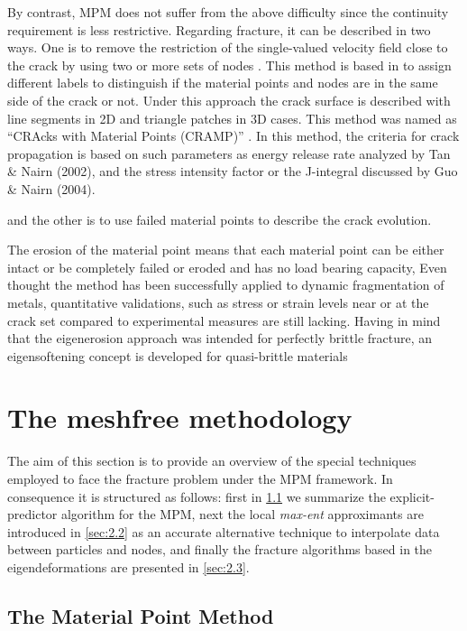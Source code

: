 \documentclass[preprint,12pt,a4paper]{elsarticle}
\begin{document}
By contrast, MPM does not suffer from the above difficulty since the
continuity requirement is less restrictive. Regarding fracture, it can
be described in two ways. One is to remove the restriction of the single-valued velocity field close to the crack by using two or
more sets of nodes \cite{Nairn_2006}. This method is based in to
assign different labels to distinguish if the material points and
nodes are in the same side of the crack or not. Under this approach
the crack surface is described with line segments in 2D and triangle
patches in 3D cases. This method was named as ``CRAcks with Material
Points (CRAMP)'' \cite{Nairn_2003}. In this method, the criteria for
crack propagation is based on such parameters as energy release rate
analyzed by Tan \& Nairn (2002)\cite{Nairn_2002}, and the stress
intensity factor or the J-integral discussed by Guo \& Nairn
(2004)\cite{Nairn_2004}.

and the other is to use failed material points to
describe the crack evolution.

The erosion of the material point means that each material point can
be either intact or be completely failed or eroded and has no load
bearing capacity, Even thought the method has been successfully
applied to dynamic fragmentation of metals, quantitative validations,
such as stress or strain levels near or at the crack set compared to
experimental measures are still lacking. Having in mind that the
eigenerosion approach was intended for perfectly brittle fracture, an
eigensoftening concept is developed for quasi-brittle materials

\section{The meshfree methodology}
\label{sec:2}

The aim of this section is to provide an overview of the special
techniques employed to face the fracture problem under the MPM
framework. In consequence it is structured as follows: first in
\ref{sec:2.1} we summarize the explicit-predictor algorithm for the
MPM, next the local \textit{max-ent} approximants are introduced in
\ref{sec:2.2} as an accurate alternative technique to interpolate data
between particles and nodes, and finally the fracture algorithms based
in the eigendeformations are presented in \ref{sec:2.3}.

\subsection{The Material Point Method}
\label{sec:2.1}
\end{document}
